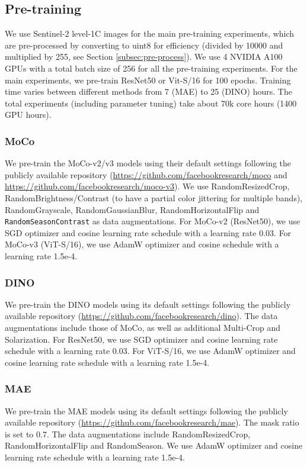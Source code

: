 \documentclass[lettersize,journal]{IEEEtran}
\begin{document}
\subsection{\textbf{Pre-training}}

We use Sentinel-2 level-1C images for the main pre-training experiments, which are pre-processed by converting to uint8 for efficiency (divided by 10000 and multiplied by 255, see Section \ref{subsec:pre-process}). We use 4 NVIDIA A100 GPUs with a total batch size of 256 for all the pre-training experiments. For the main experiments, we pre-train ResNet50 or Vit-S/16 for 100 epochs. Training time varies between different methods from 7 (MAE) to 25 (DINO) hours. The total experiments (including parameter tuning) take about 70k core hours (1400 GPU hours).

\vspace{0.5em}
\subsubsection{MoCo}
We pre-train the MoCo-v2/v3 models using their default settings following the publicly available repository (\url{https://github.com/facebookresearch/moco} and \url{https://github.com/facebookresearch/moco-v3}). We use RandomResizedCrop, RandomBrightness/Contrast (to have a partial color jittering for multiple bands), RandomGrayscale, RandomGaussianBlur, RandomHorizontalFlip and \texttt{RandomSeasonContrast} as data augmentations. For MoCo-v2 (ResNet50), we use SGD optimizer and cosine learning rate schedule with a learning rate 0.03. For MoCo-v3 (ViT-S/16), we use AdamW optimizer and cosine schedule with a learning rate 1.5e-4.

\vspace{0.3em}
\subsubsection{DINO}
We pre-train the DINO models using its default settings following the publicly available repository (\url{https://github.com/facebookresearch/dino}). The data augmentations include those of MoCo, as well as additional Multi-Crop and Solarization. For ResNet50, we use SGD optimizer and cosine learning rate schedule with a learning rate 0.03. For ViT-S/16, we use AdamW optimizer and cosine learning rate schedule with a learning rate 1.5e-4.

\vspace{0.3em}
\subsubsection{MAE}
We pre-train the MAE models using its default settings following the publicly available repository (\url{https://github.com/facebookresearch/mae}). The mask ratio is set to 0.7. The data augmentations include RandomResizedCrop, RandomHorizontalFlip and RandomSeason. We use AdamW optimizer and cosine learning rate schedule with a learning rate 1.5e-4.
\end{document}
